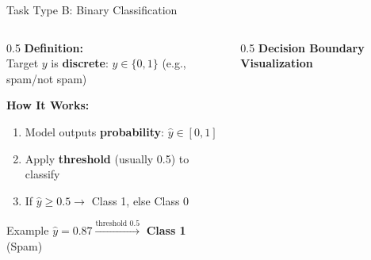 \begin{frame}{Task Type B: Binary Classification}
    \begin{columns}[c]
        \begin{column}{0.5\textwidth}
            \textbf{Definition:}\\
            Target $y$ is \textbf{discrete}: $y \in \{0, 1\}$ (e.g., spam/not spam)
            
            \vspace{1.2em}
            \textbf{How It Works:}
            \begin{enumerate}
                \item Model outputs \textbf{probability}: $\hat{y} \in [0, 1]$
                \item Apply \textbf{threshold} (usually 0.5) to classify
                \item If $\hat{y} \geq 0.5 \to$ Class 1, else Class 0
            \end{enumerate}
            
            \vspace{0.8em}
            \begin{exampleblock}{Example}
                \centering
                $\hat{y}=0.87 \xrightarrow{\text{threshold } 0.5}$ \textbf{Class 1} (Spam)
            \end{exampleblock}
        \end{column}

        \begin{column}{0.5\textwidth}
            \centering
            \textbf{Decision Boundary Visualization}
            \vspace{0.5em}
            
\end{column}
\end{columns}
\end{frame}
